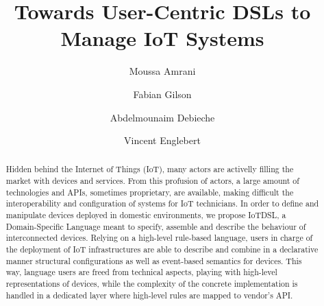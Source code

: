 \documentclass[a4paper,twoside]{llncs}
\newcommand{\IOT}{IoT\xspace}
\newcommand{\IOTDSL}{\textsf{IoTD\scriptsize\MakeUppercase{sl}}\xspace}
\begin{document}
\renewcommand{\thelstlisting}{\arabic{lstlisting}}

\title{Towards User-Centric DSLs to Manage IoT Systems}
\author{Moussa Amrani \and Fabian Gilson \and Abdelmounaim Debieche\and Vincent Englebert}




\maketitle 

\begin{abstract}
Hidden behind the Internet of Things (\IOT), many actors are activelly filling the market with devices and services. From this profusion of actors, a large amount of technologies and APIs, sometimes proprietary, are available, making difficult the interoperability and configuration of systems for \IOT technicians. In order to define and manipulate devices deployed in domestic environments, we propose \IOTDSL, a Domain-Specific Language meant to specify, assemble and describe the behaviour of interconnected devices. Relying on a high-level rule-based language, users in charge of the deployment of \IOT infrastructures are able to describe and combine in a declarative manner structural configurations as well as event-based semantics for devices. This way, language users are freed from technical aspects, playing with high-level representations of devices, while the complexity of the concrete implementation is handled in a dedicated layer where high-level rules are mapped to vendor's API.
\end{abstract}









\end{document}
